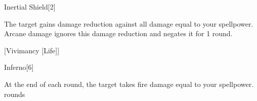 \begin{spellsection}{Inertial Shield}[2]
    \begin{spellheader}
    \end{spellheader}
    \begin{spellcontent}
        \begin{spelltargetinginfo}
        \end{spelltargetinginfo}
        \begin{spelleffects}
            \spelleffect The target gains damage reduction against all damage equal to your spellpower.
            Arcane damage ignores this damage reduction and negates it for 1 round.
            \spelldur \durshort
        \end{spelleffects}
    \end{spellcontent}
    \begin{spellfooter}
        \miscastexplode
    \end{spellfooter}
    \begin{spellaugments}
        [Vivimancy [Life]]
    \end{spellaugments}
\end{spellsection}

\begin{spellsection}{Inferno}[6]
    \begin{spellheader}
    \end{spellheader}
    \begin{spellcontent}
        \begin{spelltargetinginfo}
        \end{spelltargetinginfo}
        \begin{spelleffects}
            \spelleffect At the end of each round, the target takes fire damage equal to your spellpower.
             rounds
        \end{spelleffects}
    \end{spellcontent}
    \begin{spellfooter}
        \miscastexplode
    \end{spellfooter}
    \begin{spellaugments}
    \end{spellaugments}
\end{spellsection}

